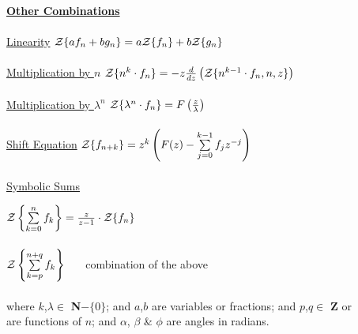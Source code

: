 \begin{tabbing}
\underline {{\bf Other Combinations}}\= \\ \\

\underline {Linearity}
  \>${\cal Z} \{a f_n+b g_n \} = a{\cal Z} \{f_n\}+b{\cal Z}\{g_n\}$
  \\ \\
\underline {Multiplication by $n$}
  \>${\cal Z} \{n^k \cdot f_n\} = -z \frac{d}{dz} \left({\cal Z}\{n^{k-1} \cdot f_n,n,z\} \right)$
  \\ \\
\underline {Multiplication by $\lambda^n$}
  \>${\cal Z} \{\lambda^n \cdot f_n\}=F \left(\frac{z}{\lambda}\right)$
  \\ \\
\underline {Shift Equation}
  \>${\cal Z} \{f_{n+k}\} =
           z^k \left(F(z) - \sum\limits^{k-1}_{j=0} f_j z^{-j}\right)$
  \\ \\
\underline {Symbolic Sums}

  \> ${\cal Z} \left\{ \sum\limits_{k=0}^{n} f_k \right\} =
                       \frac{z}{z-1} \cdot {\cal Z} \{f_n\}$ \\ \\

  \>${\cal Z} \left\{ \sum\limits_{k=p}^{n+q} f_k \right\}$
  \ \ \ combination of the above \\ \\
  where $k$,$\lambda \in$ {\bf N}$- \{0\}$; and $a$,$b$ are variables
  or fractions; and $p$,$q \in$ {\bf Z} or \\
  are functions of $n$; and $\alpha$, $\beta$ \& $\phi$ are angles
  in radians.
\end{tabbing}

